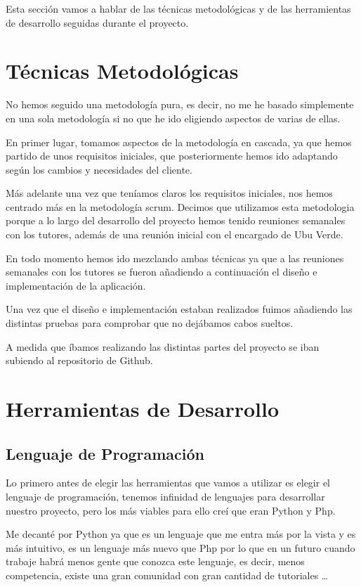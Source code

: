 Esta sección vamos a hablar de las técnicas metodológicas  y de las herramientas de desarrollo seguidas durante el proyecto.

\section{Técnicas Metodológicas}
No hemos seguido una metodología pura, es decir, no me he basado simplemente en una sola metodología si no que he ido eligiendo aspectos de varias de ellas.

En primer lugar, tomamos aspectos de la metodología en cascada\cite{ModeloenCascada}, ya que hemos partido de unos requisitos iniciales, que posteriormente hemos ido adaptando según los cambios y necesidades del cliente.

Más adelante una vez que teníamos claros los requisitos iniciales, nos hemos centrado más en la metodología scrum\cite{MetodologiaScrum}. Decimos que utilizamos esta metodologia porque a lo largo del desarrollo del proyecto hemos tenido reuniones semanales con los tutores, además de una reunión inicial con el encargado de Ubu Verde.

En todo momento hemos ido mezclando ambas técnicas ya que a las reuniones semanales con los tutores se fueron añadiendo a continuación el diseño e implementación de la aplicación.

Una vez que el diseño e implementación estaban realizados fuimos añadiendo las distintas pruebas para comprobar que no dejábamos cabos sueltos.

A medida que íbamos realizando las distintas partes del proyecto se iban subiendo al repositorio de Github.

\section{Herramientas de Desarrollo}

\subsection{Lenguaje de Programación}
Lo primero antes de elegir las herramientas que vamos a utilizar es elegir el lenguaje de programación, tenemos infinidad de lenguajes para desarrollar nuestro proyecto, pero los más viables para ello creí que eran Python\cite{Python} y Php\cite{Php}.


Me decanté por Python ya que es un lenguaje que me entra más por la vista y es más intuitivo, es un lenguaje más nuevo que Php por lo que en un futuro cuando trabaje habrá menos gente que conozca este lenguaje, es decir, menos competencia, existe una gran comunidad con gran cantidad de tutoriales \ldots

